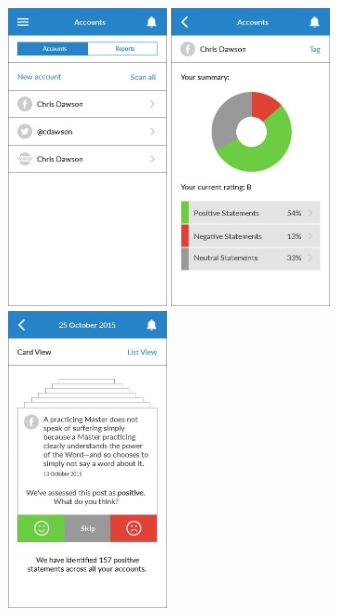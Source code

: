 \begin{figure}
  \subfigures
  \centering
  \begin{minipage}{4.6cm}
    \centering
    \includegraphics[width=4.2cm]{inc/ui_view_step1.jpg}
    \caption{}
    \label{fig:ui_view_step1}
  \end{minipage}
  \begin{minipage}{4.6cm}
    \centering
    \includegraphics[width=4.2cm]{inc/ui_view_step2.jpg}
    \caption{}
    \label{fig:ui_view_step2}
  \end{minipage}
  \begin{minipage}{4.6cm}
    \centering
    \includegraphics[width=4.2cm]{inc/ui_view_step3.jpg}
    \caption{}
    \label{fig:ui_view_step3}
  \end{minipage}
\end{figure}


